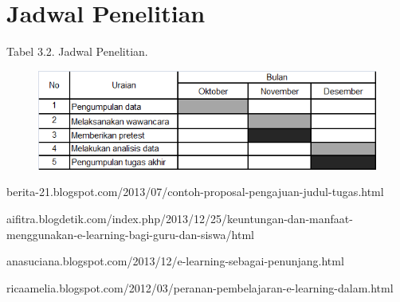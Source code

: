 \documentclass{jtetiproposalskripsi}
\begin{document}
\section{Jadwal Penelitian}

\begin{center}
Tabel 3.2. Jadwal Penelitian.
\end{center}
\vspace{-0.5cm}
\begin{figure}[ht!]
  \centering
    \includegraphics[width=14cm]{gambar/3}
\end{figure}


\begin{thebibliography}{9}

berita-21.blogspot.com/2013/07/contoh-proposal-pengajuan-judul-tugas.html

aifitra.blogdetik.com/index.php/2013/12/25/keuntungan-dan-manfaat-menggunakan-e-learning-bagi-guru-dan-siswa/html

anasuciana.blogspot.com/2013/12/e-learning-sebagai-penunjang.html

ricaamelia.blogspot.com/2012/03/peranan-pembelajaran-e-learning-dalam.html




\end{thebibliography}
\end{document}
